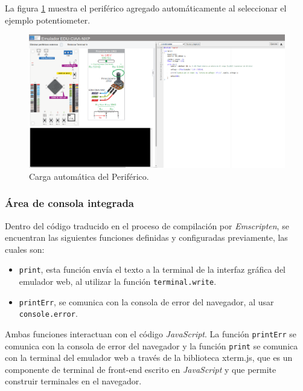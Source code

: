 La figura \ref{fig:cargarPeriferico} muestra el periférico agregado automáticamente al seleccionar el ejemplo \textquotedbl potentiometer\textquotedbl.

\begin{figure}[ht]
	\centering
	\includegraphics[scale=.21]{./Figures/cargarPeriferico.png}
	\caption{Carga automática del Periférico. }
	\label{fig:cargarPeriferico}
\end{figure}



\subsubsection{Área de consola integrada}

Dentro del código traducido en el proceso de compilación por \textit{Emscripten}, se encuentran las siguientes funciones definidas y configuradas previamente, las cuales son: 

\begin{itemize}
\item \texttt{print}, esta función envía el texto a la terminal de la interfaz gráfica del emulador web, al utilizar la función \texttt{terminal.write}.
\item \texttt{printErr}, se comunica con la consola de error del navegador, al usar \newline \texttt{console.error}.
\end{itemize}

Ambas funciones interactuan con el código \textit{JavaScript}. La función \texttt{printErr} se comunica con la consola de error del navegador y la función \texttt{print} se comunica con la terminal del emulador web a través de la biblioteca xterm.js, que es un componente de terminal de front-end escrito en \textit{JavaScript} y que permite construir terminales en el navegador. 

